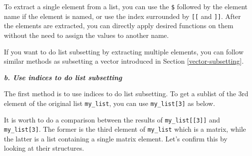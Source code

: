 \documentclass[
]{book}
\newenvironment{Shaded}{\begin{snugshade}}{\end{snugshade}}
\newcommand{\CommentTok}[1]{\textcolor[rgb]{0.56,0.35,0.01}{\textit{#1}}}
\newcommand{\DecValTok}[1]{\textcolor[rgb]{0.00,0.00,0.81}{#1}}
\newcommand{\FunctionTok}[1]{\textcolor[rgb]{0.00,0.00,0.00}{#1}}
\newcommand{\NormalTok}[1]{#1}
\newcommand{\SpecialCharTok}[1]{\textcolor[rgb]{0.00,0.00,0.00}{#1}}
\begin{document}
To extract a single element from a list, you can use the \texttt{\$} followed by the element name if the element is named, or use the index surrounded by \texttt{{[}{[}} and \texttt{{]}{]}}. After the elements are extracted, you can directly apply desired functions on them without the need to assign the values to another name.

\begin{Shaded}
\end{Shaded}

If you want to do list subsetting by extracting multiple elements, you can follow similar methods as subsetting a vector introduced in Section \ref{vector-subsetting}.

\textbf{\emph{b. Use indices to do list subsetting}}

The first method is to use indices to do list subsetting. To get a sublist of the 3rd element of the original list \texttt{my\_list}, you can use \texttt{my\_list{[}3{]}} as below.

\begin{Shaded}
\end{Shaded}

It is worth to do a comparison between the results of \texttt{my\_list{[}{[}3{]}{]}} and \texttt{my\_list{[}3{]}}. The former is the third element of \texttt{my\_list} which is a matrix, while the latter is a list containing a single matrix element. Let's confirm this by looking at their structures.
\end{document}
